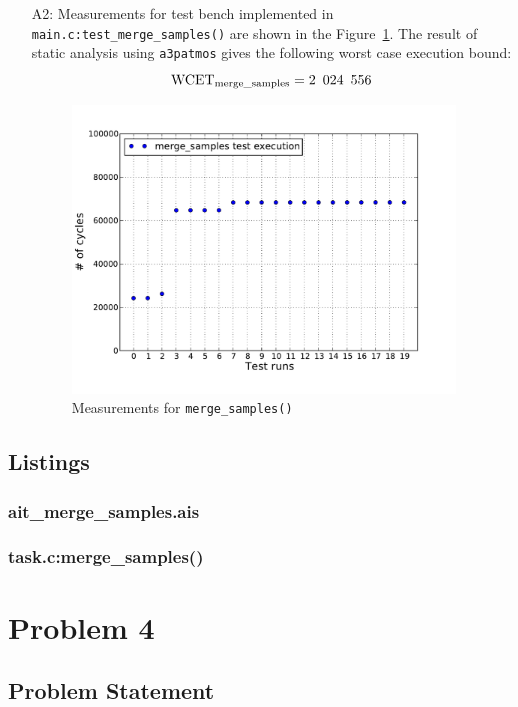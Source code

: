 \documentclass[12pt,a4paper,titlepage,oneside]{article}
\begin{document}
\begin{itemize}
\item[A2:]
  Measurements for test bench implemented in
  \texttt{main.c:test\_merge\_samples()} are shown in the
  Figure~\ref{fig:mergeSamples}.
	The result of static analysis using \texttt{a3patmos} gives the
	following worst case execution bound:
  $$\text{WCET}_{\text{merge\_samples}} = 2\enskip 024\enskip 556$$
\begin{figure}%
  \centering
  \includegraphics[width=4in]{q3_2_merge_samples}
  \caption
  {Measurements for \texttt{merge\_samples()}}
	\label{fig:mergeSamples}
\end{figure}

\end{itemize}

\subsection{Listings}
\subsubsection{ait\_merge\_samples.ais}



\subsubsection{task.c:merge\_samples()}



\newpage
\section{Problem 4}

\subsection{Problem Statement}

\end{document}

